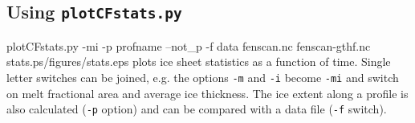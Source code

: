 \subsection{Using \texttt{plotCFstats.py}}
\begin{pycf}{plotCFstats.py -mi -p profname --not\_p -f data fenscan.nc fenscan-gthf.nc stats.ps}{\dir/figures/stats.eps}
plots ice sheet statistics as a function of time. Single letter switches can be joined, e.g. the options \texttt{-m} and \texttt{-i} become \texttt{-mi} and switch on melt fractional area and average ice thickness. The ice extent along a profile is also calculated (\texttt{-p} option) and can be compared with a data file (\texttt{-f} switch).
\end{pycf}
